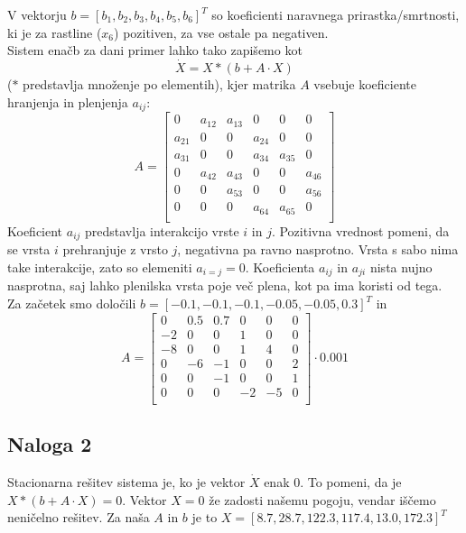 \documentclass[a4paper, 12pt]{article}
\begin{document}
V vektorju $ b = \left[b_{1}, b_{2}, b_{3}, b_{4}, b_{5}, b_{6}\right]^{T} $ so koeficienti naravnega prirastka/smrtnosti,
ki je za rastline ($ x_{6} $) pozitiven, za vse ostale pa negativen. \\
Sistem enačb za dani primer lahko tako zapišemo kot
\begin{equation}
	\dot X = X*(b+A\cdot X)
\end{equation}
($ * $ predstavlja množenje po elementih),
kjer matrika $ A $ vsebuje koeficiente hranjenja in plenjenja $ a_{ij} $:
\begin{equation}
	A =
	\begin{bmatrix}
		0 & a_{12} & a_{13} & 0 & 0 & 0 \\
		a_{21} & 0 & 0 & a_{24} & 0 & 0 \\
		a_{31} & 0 & 0 & a_{34} & a_{35} & 0 \\
		0 & a_{42} & a_{43} & 0 & 0 & a_{46} \\
		0 & 0 & a_{53} & 0 & 0 & a_{56} \\
		0 & 0 & 0 & a_{64} & a_{65} & 0 \\
	\end{bmatrix}
\end{equation}
Koeficient $ a_{ij} $ predstavlja interakcijo vrste $ i $ in $ j $. Pozitivna vrednost pomeni, da se vrsta
$ i $ prehranjuje z vrsto $ j $, negativna pa ravno nasprotno. Vrsta s sabo nima take interakcije, zato
so elemeniti $ a_{i=j} = 0 $. Koeficienta $ a_{ij} $ in $ a_{ji} $ nista nujno nasprotna, saj lahko plenilska
vrsta poje več plena, kot pa ima koristi od tega. \\
Za začetek smo določili $ b = \left[-0.1, -0.1, -0.1, -0.05, -0.05, 0.3\right]^{T} $
in 
\begin{equation}
	A = 
	\begin{bmatrix}
		0 & 0.5 & 0.7 & 0 & 0 & 0 \\
		-2 & 0 & 0 & 1 & 0 & 0 \\
		-8 & 0 & 0 & 1 & 4 & 0 \\
		0 & -6 & -1 & 0 & 0 & 2 \\
		0 & 0 & -1 & 0 & 0 & 1 \\
		0 & 0 & 0 & -2 & -5 & 0 \\
	\end{bmatrix}\cdot 0.001
\end{equation}

\subsection{Naloga 2}
Stacionarna rešitev sistema je, ko je vektor $ \dot X $ enak  $ 0 $. To pomeni, da je
$ X*(b+A\cdot X) = 0 $. Vektor $ X = 0 $ že zadosti našemu pogoju, vendar iščemo neničelno
rešitev. Za naša $ A $ in $ b $ je to $ X = \left[8.7, 28.7, 122.3, 117.4, 13.0, 172.3\right]^{T} $
\end{document}

